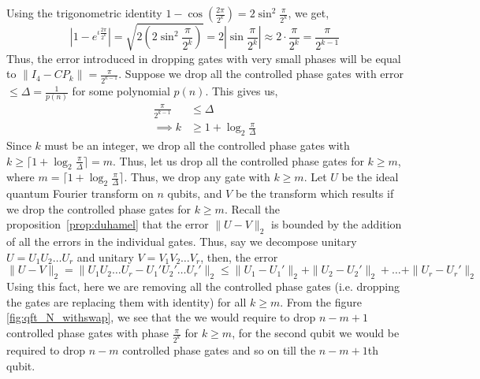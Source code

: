 Using the trigonometric identity $1-\cos(\frac{2\pi}{2^k}) = 2\sin^2 \frac{\pi}{2^k}$, we get,
\[
|1-e^{\iota\frac{2\pi}{2^k}}|=\sqrt{2\left(2\sin^2\frac{\pi}{2^k}\right)}=2|\sin\frac{\pi}{2^k}|\approx 2\cdot \frac{\pi}{2^k}=\frac{\pi}{2^{k-1}}
\]
Thus, the error introduced in dropping gates with very small phases will be equal to $\|I_4-CP_k\|=\frac{\pi}{2^{k-1}}$. Suppose we drop all the controlled phase gates with error $\leq \Delta=\frac{1}{p(n)}$ for some polynomial $p(n)$. This gives us,
\begin{align*}
    \frac{\pi}{2^{k-1}} &\leq \Delta\\
    \implies k &\geq 1 + \log_2 \frac{\pi}{\Delta}
\end{align*}
Since $k$ must be an integer, we drop all the controlled phase gates with $k\geq \lceil 1 + \log_2 \frac{\pi}{\Delta}\rceil =m$. Thus, let us drop all the controlled phase gates for $k\geq m$, where $m=\lceil 1+ \log_2 \frac{\pi}{\Delta}\rceil$. Thus, we drop any gate with $k\geq m$. Let $U$ be the ideal quantum Fourier transform on $n$ qubits, and $V$ be the transform which results if we drop the controlled phase gates for $k\geq m$. Recall the proposition~\ref{prop:duhamel} that the error $\|U-V\|_2$ is bounded by the addition of all the errors in the individual gates. Thus, say we decompose unitary $U=U_1U_2\ldots U_r$ and unitary $V=V_1V_2\ldots V_r$, then, the error
\[
\|U-V\|_2 = \|U_1U_2\ldots U_r - U_1'U_2'\ldots U_r'\|_2 \leq \|U_1-U_1'\|_2+\|U_2-U_2'\|_2 + \ldots +\|U_r-U_r'\|_2
\]
Using this fact, here we are removing all the controlled phase gates (i.e. dropping the gates are replacing them with identity) for all $k\geq m$. From the figure \ref{fig:qft_N_withswap}, we see that the we would require to drop $n-m+1$ controlled phase gates with phase $\frac{\pi}{2^k}$ for $k\geq m$, for the second qubit we would be required to drop $n-m$ controlled phase gates and so on till the $n-m+1$th qubit.

